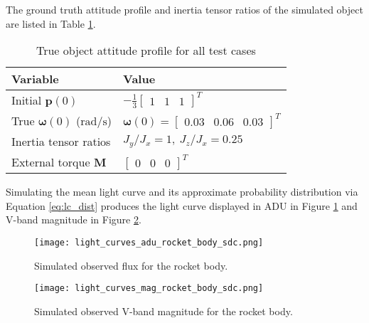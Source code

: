 \documentclass[a4paper,twocolumn]{spaceDebrisC} %
\newcommand{\vctr}[1]{\bm{#1}}
\newcommand{\figmed}[0]{0.4\textwidth}
\newcommand{\figsmall}[0]{0.3\textwidth}
\begin{document}
The ground truth attitude profile and inertia tensor ratios of the simulated object are listed in Table \ref{tb:synth_att}.

\begin{table}[H]
  \centering
  \caption{True object attitude profile for all test cases}
  \vspace*{6pt}
  \begin{tabular}{|l|l|}
  \hline
  \textbf{Variable} & \textbf{Value} \\ \hline
 Initial $\vctr{p}(0)$ & $-\frac{1}{3} \begin{bmatrix} 1 & 1 & 1 \end{bmatrix}^T$ \\ \hline
 True $\vctr{\omega}(0)$ ($\text{rad}/\text{s}$) & $\vctr{\omega}(0) = \begin{bmatrix} 0.03 & 0.06 & 0.03 \end{bmatrix}^T$ \\ \hline
 Inertia tensor ratios & $J_y / J_x = 1, \: J_z / J_x = 0.25$ \\ \hline
 External torque $\vctr{M}$ & $\begin{bmatrix} 0 & 0 & 0 \end{bmatrix}^T$ \\ \hline
  \end{tabular}
  \label{tb:synth_att}
\end{table}
\FloatBarrier

Simulating the mean light curve and its approximate probability distribution via Equation \ref{eq:lc_dist} produces the light curve displayed in ADU in Figure \ref{fig:obs_adu_synth} and V-band magnitude in Figure \ref{fig:obs_mag_synth}.

\begin{figure}[H]
  \centering
  \texttt{[image: light\_curves\_adu\_rocket\_body\_sdc.png]}
  \caption{Simulated observed flux for the rocket body.}
  \label{fig:obs_adu_synth}
\end{figure}

\begin{figure}[H]
  \centering
  \texttt{[image: light\_curves\_mag\_rocket\_body\_sdc.png]}
  \caption{Simulated observed V-band magnitude for the rocket body.}
  \label{fig:obs_mag_synth}
\end{figure}

\end{document}
